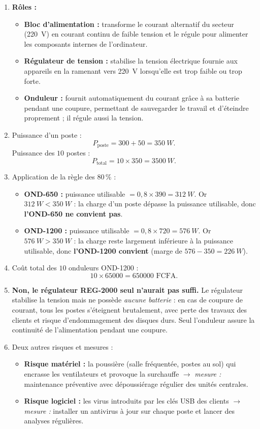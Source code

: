 \documentclass[11pt]{article}
\begin{document}
\begin{corrige}
\begin{enumerate}
\item \textbf{Rôles :}
\begin{itemize}
\item \textbf{Bloc d'alimentation :} transforme le courant alternatif du secteur (\SI{220}{V}) en courant continu de faible tension et le régule pour alimenter les composants internes de l'ordinateur.
\item \textbf{Régulateur de tension :} stabilise la tension électrique fournie aux appareils en la ramenant vers \SI{220}{V} lorsqu'elle est trop faible ou trop forte.
\item \textbf{Onduleur :} fournit automatiquement du courant grâce à sa batterie pendant une coupure, permettant de sauvegarder le travail et d'éteindre proprement ; il régule aussi la tension.
\end{itemize}
\item Puissance d'un poste :
\[ P_{\text{poste}} = 300 + 50 = \SI{350}{W}. \]
Puissance des $10$ postes :
\[ P_{\text{total}} = 10 \times 350 = \SI{3500}{W}. \]
\item Application de la règle des $80\,\%$ :
\begin{itemize}
\item \textbf{OND-650 :} puissance utilisable $= 0{,}8 \times 390 = \SI{312}{W}$. Or $\SI{312}{W} < \SI{350}{W}$ : la charge d'un poste dépasse la puissance utilisable, donc \textbf{l'OND-650 ne convient pas}.
\item \textbf{OND-1200 :} puissance utilisable $= 0{,}8 \times 720 = \SI{576}{W}$. Or $\SI{576}{W} > \SI{350}{W}$ : la charge reste largement inférieure à la puissance utilisable, donc \textbf{l'OND-1200 convient} (marge de $576 - 350 = \SI{226}{W}$).
\end{itemize}
\item Coût total des $10$ onduleurs OND-1200 :
\[ 10 \times \num{65000} = \num{650000} \text{ FCFA}. \]
\item \textbf{Non, le régulateur REG-2000 seul n'aurait pas suffi.} Le régulateur stabilise la tension mais ne possède \emph{aucune batterie} : en cas de coupure de courant, tous les postes s'éteignent brutalement, avec perte des travaux des clients et risque d'endommagement des disques durs. Seul l'onduleur assure la continuité de l'alimentation pendant une coupure.
\item Deux autres risques et mesures :
\begin{itemize}
\item \textbf{Risque matériel :} la poussière (salle fréquentée, postes au sol) qui encrasse les ventilateurs et provoque la surchauffe $\rightarrow$ \emph{mesure :} maintenance préventive avec dépoussiérage régulier des unités centrales.
\item \textbf{Risque logiciel :} les virus introduits par les clés USB des clients $\rightarrow$ \emph{mesure :} installer un antivirus à jour sur chaque poste et lancer des analyses régulières.
\end{itemize}
\end{enumerate}


\end{corrige}
\end{document}
